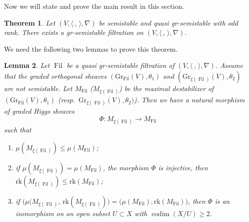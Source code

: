 \documentclass[JEP,XML,SOM,Unicode,published]{cedram}
\newcommand{\grsemistable}{gr\nobreakdash-semi\-stable\xspace}
\DeclareMathOperator{\codim}{codim}
\DeclareMathOperator{\Filt}{Fil}
\newcommand{\rk}{\mathrm{rk}}
\newcommand{\Gr}{\mathrm{Gr}}
\theoremstyle{plain}
\newtheorem{thm}{Theorem}[section]
\newtheorem{lem}[thm]{Lemma}
\theoremstyle{definition}
\begin{document}
Now we will state and prove the main result in this section.
\begin{thm}\label{main thm}
Let $(V,\langle \,, \, \rangle,\nabla)$ be semistable and quasi \grsemistable with odd rank. There exists a \grsemistable filtration on $(V,\langle \,, \, \rangle,\nabla)$.
\end{thm}

We need the following two lemmas to prove this theorem.
\begin{lem}\label{decrease}
Let $\Filt$ be a quasi \grsemistable filtration of $(V, \langle \,, \, \rangle, \nabla)$. Assume that the graded orthogonal sheaves $(\Gr_{\Filt}(V),\theta_1)$ and $(\Gr_{\xi(\Filt)}(V),\theta_2)$ are not semistable. Let $M_{\Filt}$ (\resp $M_{\xi(\Filt)}$) be the maximal destabilizer of $(\Gr_{\Filt}(V),\theta_1)$ (resp.\ $\Gr_{\xi(\Filt)}(V),\theta_2)$). Then we have a natural morphism of graded Higgs sheaves
\[
\Phi: M_{\xi(\Filt)}\to M_{\Filt}
\]
such that
\begin{enumerate}
\item $\mu(M_{\xi(\Filt)})\leq \mu(M_{\Filt})$;
\item if $\mu(M_{\xi(\Filt)})= \mu(M_{\Filt})$, the morphism $\Phi$ is injective, then $\rk(M_{\xi(\Filt)})\leq\rk(M_{\Filt})$;
\item if $\big(\mu(M_{\xi(\Filt)},\ \rk(M_{\xi(\Filt)})\big)= \big(\mu(M_{\Filt}),\rk(M_{\Filt})\big)$, then $\Phi$ is an isomorphism on an open subset $U \subset X$ with $\codim(X/U) \geq 2$.
\end{enumerate}
\end{lem}
\end{document}
